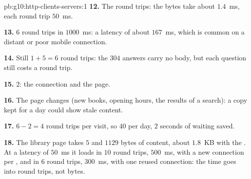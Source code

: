 \begin{solution}{pb:g10:http-clients-servers:1}
\textbf{12.} The round trips: the bytes take about $1.4$~ms, each round trip $50$~ms.

\textbf{13.} $6$ round trips in $1000$~ms: a latency of about $167$~ms, which is common on a distant or poor
mobile connection.

\textbf{14.} Still $1 + 5 = 6$ round trips: the $304$ answers carry no body, but each question still costs a round
trip.

\textbf{15.} $2$: the connection and the page.

\textbf{16.} The page changes (new books, opening hours, the results of a search): a copy kept for a day could show
stale content.

\textbf{17.} $6 - 2 = 4$ round trips per visit, so $40$ per day, $2$ seconds of waiting saved.

\textbf{18.} The library page takes $5$  and $1129$ bytes of content, about $1.8$~KB with the . At a
latency of $50$~ms it loads in $10$ round trips, $500$~ms, with a new connection per , and in $6$ round trips,
$300$~ms, with one reused connection: the time goes into round trips, not bytes.
\end{solution}
